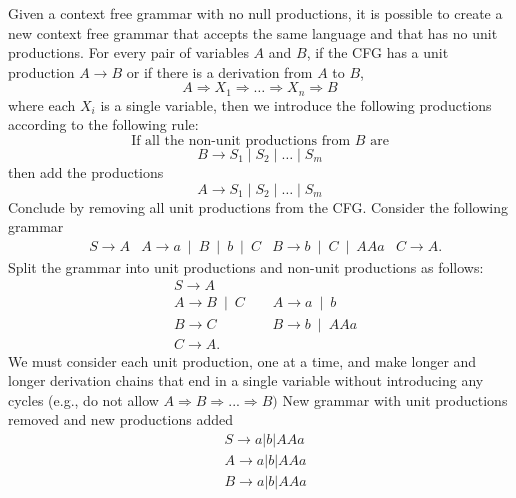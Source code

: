 \documentclass{report}
\begin{document}
\begin{itemize}
            \bigbreak \noindent 
            Given a context free grammar with no null productions, it is possible to create a new context free grammar that accepts the same language and that has no unit productions.
            \bigbreak \noindent 
            For every pair of variables \(A\) and \(B\), if the CFG has a unit production \(A \rightarrow B\) or if there is a derivation from \(A\) to \(B\),
            \[
                A \Rightarrow X_1 \Rightarrow \dots \Rightarrow X_n \Rightarrow B
            \]
            where each \(X_i\) is a single variable, then we introduce the following productions according to the following rule:
            \[
                \text{If all the non-unit productions from } B \text{ are}
            \]
            \[
                B \rightarrow S_1 \mid S_2 \mid \dots \mid S_m
            \]
            then add the productions
            \[
                A \rightarrow S_1 \mid S_2 \mid \dots \mid S_m
            \]
            Conclude by removing all unit productions from the CFG.
            \bigbreak \noindent 
            Consider the following grammar
            \begin{align*}
                &S\to A
                &A\to a \ \mid \ B \ \mid \ b \ \mid \ C
                &B\to b \ \mid \ C \ \mid \ AAa
                &C\to A
            .\end{align*}
            Split the grammar into unit productions and non-unit productions as follows:
            \begin{align*}
                &S \to A \\
                &A\to B \ \mid \ C \quad \quad A\to a \ \mid \ b \\
                &B\to C \quad \quad \quad \quad  B\to b \ \mid \ AAa \\
                &C\to A
            .\end{align*}
            \bigbreak \noindent 
            We must consider each unit production, one at a time, and make longer and longer derivation chains that end in a single variable without introducing any cycles (e.g., do not allow $A \Rightarrow B \Rightarrow... \Rightarrow B)$
            \bigbreak \noindent 
            New grammar with unit productions removed and new productions added
            \begin{align*}
                &S \to a | b | AAa \\
                &A \to a | b | AAa \\
                &B \to a | b | AAa \\

\end{align*}
\end{itemize}
\end{document}

